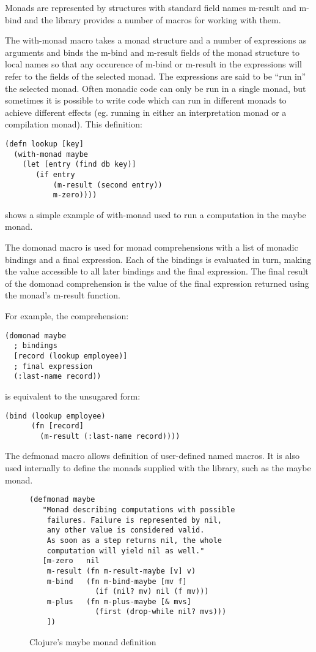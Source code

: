 \documentclass[natbib,10pt]{sigplanconf}
\begin{document}
Monads are represented by structures with standard field names
{\mono m-result} and {\mono m-bind} and the library provides a number of
macros for working with them.

The {\mono with-monad} macro takes a monad structure and a number of
expressions as arguments and binds the {\mono m-bind} and {\mono
  m-result} fields of the monad structure to local names so that any
occurence of {\mono m-bind} or {\mono m-result} in the expressions
will refer to the fields of the selected monad.  The expressions are
said to be ``run in'' the selected monad.  Often monadic code can only
be run in a single monad, but sometimes it is possible to write code
which can run in different monads to achieve different effects
(eg. running in either an interpretation monad or a compilation
monad).  This definition:
\begin{verbatim}
(defn lookup [key]
  (with-monad maybe
    (let [entry (find db key)]
       (if entry
           (m-result (second entry))
           m-zero))))
\end{verbatim}
shows a simple example of {\mono with-monad} used to run a computation
in the {\mono maybe} monad.

The {\mono domonad} macro is used for monad comprehensions with a list
of monadic bindings and a final expression.  Each of the bindings is
evaluated in turn, making the value accessible to all later bindings
and the final expression.  The final result of the {\mono domonad}
comprehension is the value of the final expression returned using
the monad's {\mono m-result} function.

For example, the comprehension:
\begin{verbatim}
(domonad maybe
  ; bindings
  [record (lookup employee)]
  ; final expression
  (:last-name record))
\end{verbatim}
is equivalent to the unsugared form:
\begin{verbatim}
(bind (lookup employee)
      (fn [record]
        (m-result (:last-name record))))
\end{verbatim}

The {\mono defmonad} macro allows definition of user-defined named
macros.  It is also used internally to define the monads supplied
with the library, such as the {\mono maybe} monad.

\begin{figure}
\begin{center}
\begin{verbatim}
(defmonad maybe
   "Monad describing computations with possible
    failures. Failure is represented by nil,
    any other value is considered valid.
    As soon as a step returns nil, the whole
    computation will yield nil as well."
   [m-zero   nil
    m-result (fn m-result-maybe [v] v)
    m-bind   (fn m-bind-maybe [mv f]
               (if (nil? mv) nil (f mv)))
    m-plus   (fn m-plus-maybe [& mvs]
               (first (drop-while nil? mvs)))
    ])

\end{verbatim}
\end{center}
\caption{Clojure's maybe monad definition}
\label{fig-Clojure-maybe-defn}
\end{figure}
\end{document}
